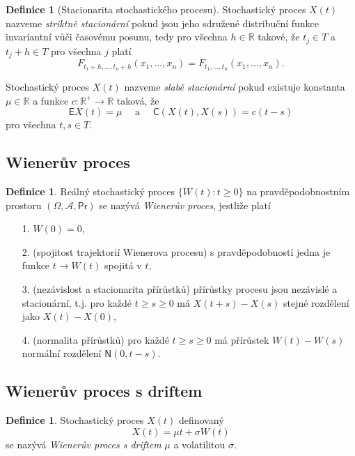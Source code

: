 \documentclass[a4paper,12pt]{report}
\theoremstyle{definition} \newtheorem{definice}[veta]{Definice}
\theoremstyle{remark}
\begin{document}
\begin{definice}[Stacionarita stochastického procesu]
Stochastický proces $X(t)$ nazveme \textit{striktně stacionární} pokud jsou jeho sdružené distribuční funkce invariantní vůči časovému posunu, tedy pro všechna $h\in\mathbb{R}$ takové, že $t_j\in T$ a $t_j+h\in T$ pro všechna $j$ platí
$$F_{t_1+h,\dots,t_n+h}(x_1,\dots,x_n)=F_{t_1,\dots,t_n}(x_1,\dots,x_n).$$   

Stochastický proces $X(t)$ nazveme \textit{slabě stacionární} pokud existuje konstanta $\mu\in\mathbb{R}$ a funkce $c:\mathbb{R}^+\to\mathbb{R}$ taková, že
$$\mathsf{E}{X(t)}=\mu\quad\text{ a }\quad\mathsf{C}(X(t),X(s))=c(t-s)$$
pro všechna $t,s\in T$.
\end{definice}



\subsection{Wienerův proces}

\begin{definice}
Reálný stochastický proces $\{W(t):t\ge0\}$ na pravdě\-podob\-nostním prostoru $(\Omega,\mathcal{A},\mathsf{Pr})$ se nazývá \textit{Wienerův proces}, jestliže platí
\begin{enumerate}
\item[1.]$W(0)=0$, 
\item[2.](spojitost trajektorií Wienerova procesu) s pravděpodobností jedna je funkce $t\to W(t)$ spojitá v $t$,
\item[3.](nezávislost a stacionarita přírůstků) přírůstky procesu jsou nezávislé a stacionární, t.j.  pro každé $t\ge s\ge0$ má $X(t+s)-X(s)$ stejné rozdělení jako $X(t)-X(0)$,
\item[4.](normalita přírůstků) pro každé $t\ge s\ge0$ má přírůstek $W(t)-W(s)$ normální rozdělení $\mathsf{N}(0, t-s)$.
\end{enumerate}
\end{definice}

\subsection{Wienerův proces s driftem}
\begin{definice}
Stochastický proces $X(t)$ definovaný 
$$X(t)  = \mu t + \sigma W (t)$$
se nazývá \textit{Wienerův proces  s driftem} $\mu$ a volatilitou $\sigma$.
\end{definice}
\end{document}
